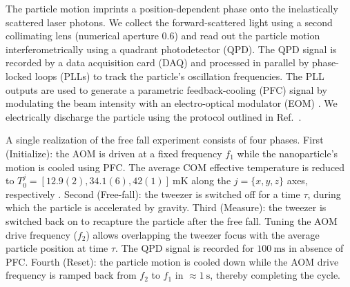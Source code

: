 \documentclass[twocolumn,preprintnumbers,superscriptaddress,amsmath,amssymb,aps,pra,10pt]{revtex4-1}
\newcommand{\<}{\langle}
\renewcommand{\>}{\rangle}
\renewcommand{\>}{\rangle}
\begin{document}
The particle motion imprints a position-dependent phase onto the inelastically scattered laser photons.
%
We collect the forward-scattered light using a second collimating lens (numerical aperture 0.6) and read out the particle motion interferometrically using a quadrant photodetector (QPD).
%
The QPD signal is recorded by a data acquisition card (DAQ) and processed in parallel by phase-locked loops (PLLs) to track the particle's oscillation frequencies.
%
The PLL outputs are used to generate a parametric feedback-cooling (PFC) signal by modulating the beam intensity with an electro-optical modulator (EOM) \cite{Gieseler2012,Jain2016}.
%
We electrically discharge the particle using the protocol outlined in Ref.~\cite{frimmer2017controlling}.


A single realization of the free fall experiment consists of four phases.
%
First (Initialize): the AOM is driven at a fixed frequency $f_1$ while the nanoparticle's motion is cooled using PFC. The average COM effective temperature is reduced to $T_\text{0}^j=[12.9(2),34.1(6),42(1)]~\mathrm{mK}$ along the $j=\lbrace x,y,z\rbrace$ axes, respectively \cite{supplemental}. 
%
Second (Free-fall): the tweezer is switched off for a time $\tau$, during which the particle is accelerated by gravity.
%
Third (Measure): the tweezer is switched back on to recapture the particle after the free fall. Tuning the AOM drive frequency ($f_2$) allows overlapping the tweezer focus with the average particle position at time $\tau$. The QPD signal is recorded for $100~\mathrm{ms}$ in absence of PFC.
%
Fourth (Reset): the particle motion is cooled down while the AOM drive frequency is ramped back from $f_2$ to $f_1$ in $\approx1~\mathrm{s}$, thereby completing the cycle. 
\end{document}
